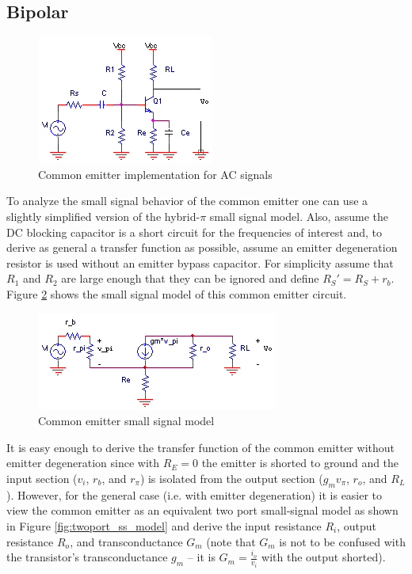 \subsection{Bipolar}
\begin{figure}[h]
	\centering
		\includegraphics{schematics/commonemitter.PNG}
	\caption{Common emitter implementation for AC signals}
	\label{fig:commonemitter}
\end{figure}
\par
To analyze the small signal behavior of the common emitter one can use a slightly simplified version of the hybrid-$\pi$ small signal model. Also, assume the DC blocking capacitor is a short circuit for the frequencies of interest and, to derive as general a transfer function as possible, assume an emitter degeneration resistor is used without an emitter bypass capacitor. For simplicity assume that $R_{1}$ and $R_{2}$ are large enough that they can be ignored and define $R_{S}' = R_{S}+r_{b}$. Figure \ref{fig:ss_commonemitter} shows the small signal model of this common emitter circuit.
\begin{figure}[h]
	\centering
		\includegraphics{schematics/ss_commonemitter.PNG}
	\caption{Common emitter small signal model}
	\label{fig:ss_commonemitter}
\end{figure}
\par
It is easy enough to derive the transfer function of the common emitter without emitter degeneration since with $R_{E} = 0$ the emitter is shorted to ground and the input section ($v_{i}$, $r_{b}$, and $r_{\pi}$) is isolated from the output section ($g_{m}v_{\pi}$, $r_{o}$, and $R_{L}$). However, for the general case (i.e. with emitter degeneration) it is easier to view the common emitter as an equivalent two port small-signal model as shown in Figure \ref{fig:twoport_ss_model} and derive the input resistance $R_{i}$, output resistance $R_{o}$, and transconductance $G_{m}$ (note that $G_{m}$ is not to be confused with the transistor's transconductance $g_{m}$ -- it is $G_{m} = \frac{i_{o}}{v_{i}}$ with the output shorted).
